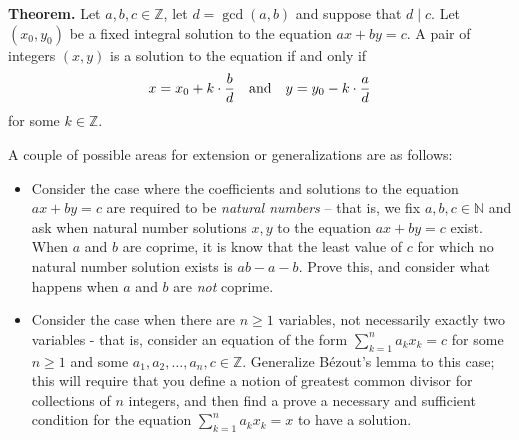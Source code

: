 \documentclass{article}
\begin{document}
    \vspace{3mm}
    \textbf{Theorem.} Let $a, b, c \in \mathbb{Z}$, let $d = \gcd(a, b)$ and suppose that $d \mid c$. Let $(x_{0}, y_{0})$ be a fixed integral solution to the equation $ax + by = c$. A pair of integers $(x, y)$ is a solution to the equation if and only if $$x = x_{0} + k \cdot \frac{b}{d} \text{\quad and\quad} y = y_{0} - k \cdot \frac{a}{d}$$ for some $k \in \mathbb{Z}$.
    
    \vspace{3mm}
    A couple of possible areas for extension or generalizations are as follows:
    \begin{itemize}
        \item Consider the case where the coefficients and solutions to the equation $ax + by = c$ are required to be \textit{natural numbers} -- that is, we fix $a, b, c \in \mathbb{N}$ and ask when natural number solutions $x, y$ to the equation $ax + by = c$ exist. When $a$ and $b$ are coprime, it is know that the least value of $c$ for which no natural number solution exists is $ab - a - b$. Prove this, and consider what happens when $a$ and $b$ are \textit{not} coprime.
        \item Consider the case when there are $n \ge 1$ variables, not necessarily exactly two variables - that is, consider an equation of the form $\sum_{k = 1}^{n} a_{k}x_{k} = c$ for some $n \ge 1$ and some $a_{1}, a_{2}, \dots, a_{n}, c \in \mathbb{Z}$. Generalize B\'ezout's lemma to this case; this will require that you define a notion of greatest common divisor for collections of $n$ integers, and then find a prove a necessary and sufficient condition for the equation $\sum_{k = 1}^{n} a_{k}x_{k} = x$ to have a solution.
    \end{itemize}
    
\end{document}

